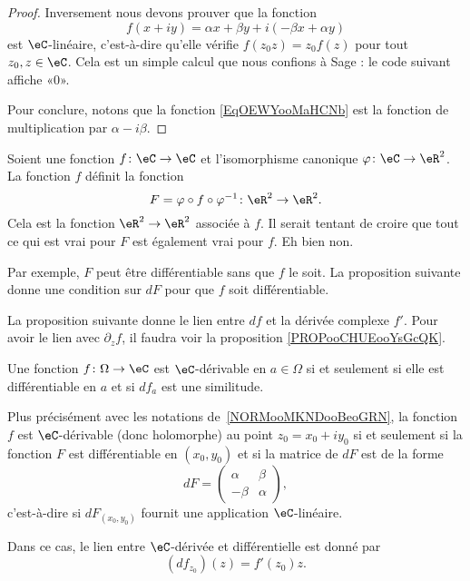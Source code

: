 \begin{proof}
	Inversement nous devons prouver que la fonction
	\begin{equation}        \label{EqOEWYooMaHCNb}
		f(x+iy)=\alpha x+\beta y+i(-\beta x+\alpha y)
	\end{equation}
	est \( \eC\)-linéaire, c'est-à-dire qu'elle vérifie \( f(z_0z)=z_0f(z)\) pour tout \( z_0,z\in \eC\). Cela est un simple calcul que nous confions à Sage : le code suivant affiche «\( 0\)».
	

	Pour conclure, notons que la fonction \eqref{EqOEWYooMaHCNb} est la fonction de multiplication par \( \alpha-i\beta\).
\end{proof}

\begin{normaltext}      \label{NORMooMKNDooBeoGRN}
	Soient une fonction \( f\colon \eC\to \eC\) et l'isomorphisme canonique \( \varphi\colon \eC\to \eR^2\). La fonction \( f\) définit la fonction
	\begin{equation}
		F=\varphi \circ f\circ \varphi^{-1}\colon \eR^2\to \eR^2.
	\end{equation}
	Cela est la fonction \( \eR^2\to \eR^2\) associée à \( f\). Il serait tentant de croire que tout ce qui est vrai pour \( F\) est également vrai pour \( f\). Eh bien non.

	Par exemple, \( F\) peut être différentiable sans que \( f\) le soit. La proposition suivante donne une condition sur \( dF\) pour que \( f\) soit différentiable.
\end{normaltext}

La proposition suivante donne le lien entre \( df\) et la dérivée complexe \( f'\). Pour avoir le lien avec \( \partial_zf\), il faudra voir la proposition \ref{PROPooCHUEooYsGcQK}.
\begin{proposition}     \label{PropKJUDooJfqgYS}
	Une fonction \( f\colon \Omega\to \eC\) est \( \eC\)-dérivable en \( a\in\Omega\) si et seulement si elle est différentiable en \( a\) et si \( df_a\) est une similitude.

	Plus précisément avec les notations de~\ref{NORMooMKNDooBeoGRN}, la fonction \( f\) est \( \eC\)-dérivable (donc holomorphe) au point \( z_0=x_0+iy_0\) si et seulement si la fonction \( F\) est différentiable en \( (x_0,y_0)\) et si la matrice de \( dF\) est de la forme
	\begin{equation}        \label{EQooWZGKooLDEHGr}
		dF=\begin{pmatrix}
			\alpha & \beta  \\
			-\beta & \alpha
		\end{pmatrix},
	\end{equation}
	c'est-à-dire si \( dF_{(x_0,y_0)}\) fournit une application \( \eC\)-linéaire.

	Dans ce cas, le lien entre \( \eC\)-dérivée et différentielle est donné par
	\begin{equation}        \label{EqPAEFooYNhYpz}
		(df_{z_0})(z)=f'(z_0)z.
	\end{equation}
\end{proposition}

